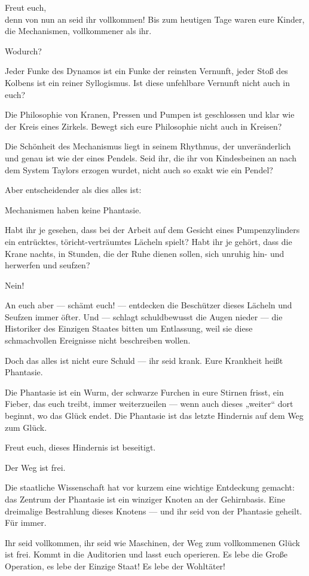 \begin{meldung}
Freut euch,\\
denn von nun an seid ihr vollkommen! Bis zum heutigen
Tage waren eure Kinder, die Mechanismen, vollkommener als ihr.

Wodurch?

Jeder Funke des Dynamos ist ein Funke der reinsten Vernunft, jeder
Stoß des Kolbens ist ein reiner Syllogismus. Ist diese unfehlbare
Vernunft nicht auch in euch?

Die Philosophie von Kranen, Pressen
und Pumpen ist geschlossen und klar wie der Kreis eines Zirkels.
Bewegt sich eure Philosophie nicht auch in Kreisen?

Die Schönheit
des Mechanismus liegt in seinem Rhythmus, der unveränderlich und
genau ist wie der eines Pendels. Seid ihr, die ihr von Kindesbeinen
an nach dem System Taylors erzogen wurdet, nicht auch so exakt wie
ein Pendel?

Aber entscheidender als dies alles ist:

Mechanismen haben keine Phantasie.

Habt ihr je gesehen, dass bei der Arbeit auf dem Gesicht
eines Pumpenzylinders ein entrücktes, töricht-verträumtes Lächeln
spielt? Habt ihr je gehört, dass die Krane nachts, in Stunden, die
der Ruhe dienen sollen, sich unruhig hin- und herwerfen und seufzen?

Nein!

An euch aber — schämt euch! — entdecken die Beschützer dieses
Lächeln und Seufzen immer öfter. Und — schlagt schuldbewusst die
Augen nieder — die Historiker des Einzigen Staates bitten um
Entlassung, weil sie diese schmachvollen Ereignisse nicht
beschreiben wollen.

Doch das alles ist nicht eure Schuld — ihr seid
krank. Eure Krankheit heißt Phantasie.

Die Phantasie ist ein Wurm, der schwarze Furchen in eure Stirnen
frisst, ein Fieber, das euch treibt, immer weiterzueilen — wenn
auch dieses „weiter“ dort beginnt, wo das Glück endet. Die
Phantasie ist das letzte Hindernis auf dem Weg zum Glück.

Freut euch, dieses Hindernis ist beseitigt.

Der Weg ist frei.

Die staatliche Wissenschaft hat vor kurzem eine wichtige Entdeckung
gemacht: das Zentrum der Phantasie ist ein winziger Knoten an der
Gehirnbasis. Eine dreimalige Bestrahlung dieses Knotens — und ihr
seid von der Phantasie geheilt. Für immer.

Ihr seid vollkommen, ihr seid wie Maschinen, der Weg zum
vollkommenen Glück ist frei. Kommt in die Auditorien und lasst euch
operieren. Es lebe die Große Operation, es lebe der Einzige Staat!
Es lebe der Wohltäter!
\end{meldung}

